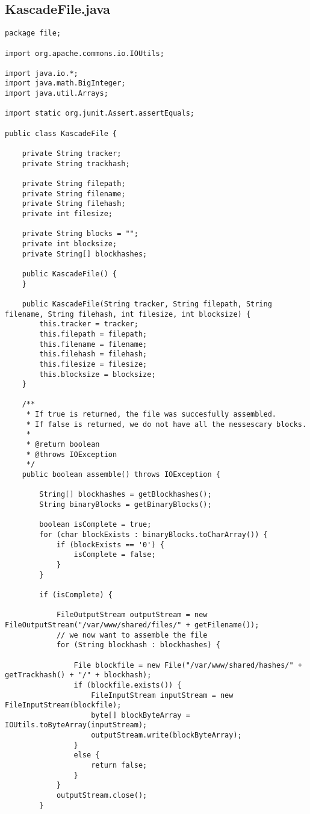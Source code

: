 \documentclass{acm_proc_article-sp}
\begin{document}
\subsection{KascadeFile.java}
\begin{lstlisting}
package file;

import org.apache.commons.io.IOUtils;

import java.io.*;
import java.math.BigInteger;
import java.util.Arrays;

import static org.junit.Assert.assertEquals;

public class KascadeFile {

    private String tracker;
    private String trackhash;

    private String filepath;
    private String filename;
    private String filehash;
    private int filesize;

    private String blocks = "";
    private int blocksize;
    private String[] blockhashes;

    public KascadeFile() {
    }

    public KascadeFile(String tracker, String filepath, String filename, String filehash, int filesize, int blocksize) {
        this.tracker = tracker;
        this.filepath = filepath;
        this.filename = filename;
        this.filehash = filehash;
        this.filesize = filesize;
        this.blocksize = blocksize;
    }

    /**
     * If true is returned, the file was succesfully assembled.
     * If false is returned, we do not have all the nessescary blocks.
     *
     * @return boolean
     * @throws IOException
     */
    public boolean assemble() throws IOException {

        String[] blockhashes = getBlockhashes();
        String binaryBlocks = getBinaryBlocks();

        boolean isComplete = true;
        for (char blockExists : binaryBlocks.toCharArray()) {
            if (blockExists == '0') {
                isComplete = false;
            }
        }

        if (isComplete) {

            FileOutputStream outputStream = new FileOutputStream("/var/www/shared/files/" + getFilename());
            // we now want to assemble the file
            for (String blockhash : blockhashes) {

                File blockfile = new File("/var/www/shared/hashes/" + getTrackhash() + "/" + blockhash);
                if (blockfile.exists()) {
                    FileInputStream inputStream = new FileInputStream(blockfile);
                    byte[] blockByteArray = IOUtils.toByteArray(inputStream);
                    outputStream.write(blockByteArray);
                }
                else {
                    return false;
                }
            }
            outputStream.close();
        }




\end{lstlisting}
\end{document}
